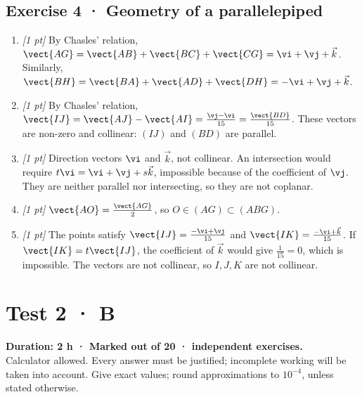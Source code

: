 \subsection*{Exercise 4 · Geometry of a parallelepiped}\begin{enumerate}

\item \textit{[1 pt]} By Chasles' relation, $\vect{AG}=\vect{AB}+\vect{BC}+\vect{CG}=\vi +\vj +\vec k$. Similarly, $\vect{BH}=\vect{BA}+\vect{AD}+\vect{DH}=-\vi +\vj +\vec k$.

\item \textit{[1 pt]} By Chasles' relation, $\vect{IJ}=\vect{AJ}-\vect{AI}=\frac{\vj -\vi }{15}=\frac{\vect{BD}}{15}$. These vectors are non-zero and collinear: $(IJ)$ and $(BD)$ are parallel.

\item \textit{[1 pt]} Direction vectors $\vi $ and $\vec k$, not collinear. An intersection would require $t\vi =\vi +\vj +s\vec k$, impossible because of the coefficient of $\vj $. They are neither parallel nor intersecting, so they are not coplanar.

\item \textit{[1 pt]} $\vect{AO}=\frac{\vect{AG}}{2}$, so $O\in(AG)\subset(ABG)$.

\item \textit{[1 pt]} The points satisfy $\vect{IJ}=\frac{-\vi +\vj }{15}$ and $\vect{IK}=\frac{-\vi +\vec k}{15}$. If $\vect{IK}=t\vect{IJ}$, the coefficient of $\vec k$ would give $\frac{1}{15}=0$, which is impossible. The vectors are not collinear, so $I,J,K$ are not collinear.

\end{enumerate}

\fi

\fi

\ifmxteacher

\mxnewpage{}\label{sujet:2-4}

\section*{Test 2 · B}


\textbf{Duration: 2 h · Marked out of 20 ·  independent exercises.}\\Calculator allowed. Every answer must be justified; incomplete working will be taken into account. Give exact values; round approximations to $10^{-4}$, unless stated otherwise.

